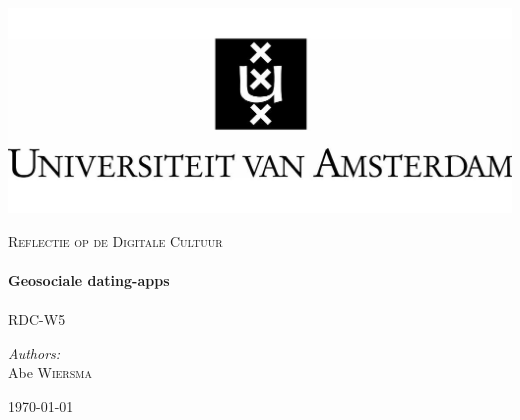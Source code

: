 \begin{titlepage}

\begin{flushleft}
\includegraphics[trim=23mm 0mm 0mm 0mm, width=1\textwidth]{./logo.jpg}\\[1cm] \end{flushleft}
\begin{center}
	\textsc{\Large Reflectie op de Digitale Cultuur}\\[0.5cm]

    \HRule \\[0.4cm] { \huge \bfseries Geosociale dating-apps}\\[0.4cm]

    \HRule \\[1.5cm]
    RDC-W5

\begin{minipage}{0.4\textwidth}
\begin{flushleft} \large \emph{Authors:}\\
Abe \textsc{Wiersma}\\
\end{flushleft}
\end{minipage}
\begin{minipage}{0.4\textwidth} \begin{flushright} \large \end{flushright}\end{minipage}

    \vfill

    {\large \today}

\end{center}
\end{titlepage}
\pagebreak
